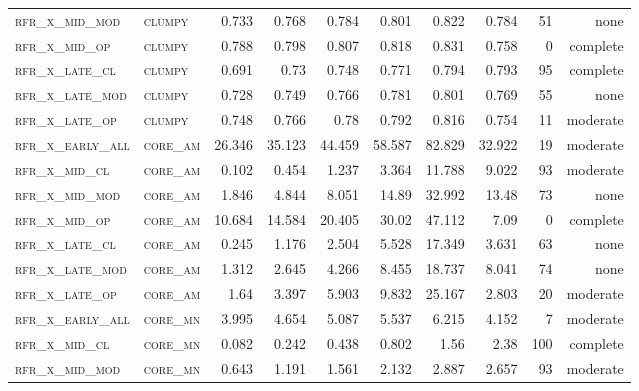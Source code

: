 \begin{landscape}
\begin{center}
\begin{footnotesize}
\begin{longtable}{llrrrrr|rrr}
\textsc{rfr\_x\_mid\_mod  } & \textsc{clumpy    }   & 0.733   & 0.768   & 0.784    & 0.801    & 0.822    & 0.784   & 51  & none     \\
\textsc{rfr\_x\_mid\_op   } & \textsc{clumpy    }   & 0.788   & 0.798   & 0.807    & 0.818    & 0.831    & 0.758   & 0   & complete \\
\textsc{rfr\_x\_late\_cl  } & \textsc{clumpy    }   & 0.691   & 0.73    & 0.748    & 0.771    & 0.794    & 0.793   & 95  & complete \\
\textsc{rfr\_x\_late\_mod } & \textsc{clumpy    }   & 0.728   & 0.749   & 0.766    & 0.781    & 0.801    & 0.769   & 55  & none     \\
\textsc{rfr\_x\_late\_op  } & \textsc{clumpy    }   & 0.748   & 0.766   & 0.78     & 0.792    & 0.816    & 0.754   & 11  & moderate \\
\textsc{rfr\_x\_early\_all} & \textsc{core\_am  }   & 26.346  & 35.123  & 44.459   & 58.587   & 82.829   & 32.922  & 19  & moderate \\
\textsc{rfr\_x\_mid\_cl   } & \textsc{core\_am  }   & 0.102   & 0.454   & 1.237    & 3.364    & 11.788   & 9.022   & 93  & moderate \\
\textsc{rfr\_x\_mid\_mod  } & \textsc{core\_am  }   & 1.846   & 4.844   & 8.051    & 14.89    & 32.992   & 13.48   & 73  & none     \\
\textsc{rfr\_x\_mid\_op   } & \textsc{core\_am  }   & 10.684  & 14.584  & 20.405   & 30.02    & 47.112   & 7.09    & 0   & complete \\
\textsc{rfr\_x\_late\_cl  } & \textsc{core\_am  }   & 0.245   & 1.176   & 2.504    & 5.528    & 17.349   & 3.631   & 63  & none     \\
\textsc{rfr\_x\_late\_mod } & \textsc{core\_am  }   & 1.312   & 2.645   & 4.266    & 8.455    & 18.737   & 8.041   & 74  & none     \\
\textsc{rfr\_x\_late\_op  } & \textsc{core\_am  }   & 1.64    & 3.397   & 5.903    & 9.832    & 25.167   & 2.803   & 20  & moderate \\
\textsc{rfr\_x\_early\_all} & \textsc{core\_mn  }   & 3.995   & 4.654   & 5.087    & 5.537    & 6.215    & 4.152   & 7   & moderate \\
\textsc{rfr\_x\_mid\_cl   } & \textsc{core\_mn  }   & 0.082   & 0.242   & 0.438    & 0.802    & 1.56     & 2.38    & 100 & complete \\
\textsc{rfr\_x\_mid\_mod  } & \textsc{core\_mn  }   & 0.643   & 1.191   & 1.561    & 2.132    & 2.887    & 2.657   & 93  & moderate \\

\end{longtable}
\end{footnotesize}
\end{center}
\end{landscape}
